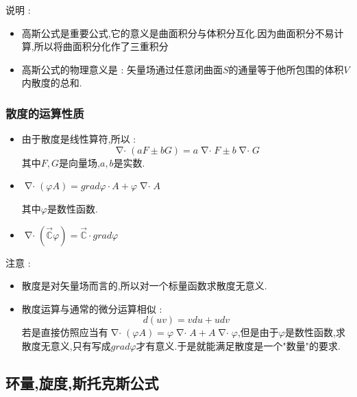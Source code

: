 \documentclass[UTF8,12pt]{ctexbook}
\newcommand{\mathConstant}{\mathbb{C}}
\DeclareMathOperator{\divergenceSymbol}{\nabla\cdot}
\begin{document}
{{{{{      说明 :
      \begin{itemize}
        \item {
              高斯公式是重要公式,它的意义是曲面积分与体积分互化.因为曲面积分不易计算,所以将曲面积分化作了三重积分
              }
        \item {
              高斯公式的物理意义是 : 矢量场通过任意闭曲面$S$的通量等于他所包围的体积$V$内散度的总和.
              }
      \end{itemize}
    }%

    \subsubsection{散度的运算性质}{
      \begin{itemize}
        \item {
              由于散度是线性算符,所以 :
              $$
                \divergenceSymbol(aF \pm bG) = a\divergenceSymbol F \pm b\divergenceSymbol G
              $$
              其中$F,G$是向量场,$a,b$是实数.
              }
        \item {
              $\divergenceSymbol(\varphi A) = grad \varphi \cdot A + \varphi\divergenceSymbol A$

              其中$\varphi$是数性函数.
              }
        \item {
              $\divergenceSymbol (\vec{\mathConstant}\varphi) = \vec{\mathConstant} \cdot grad \varphi$
              }
      \end{itemize}

      注意 :
      \begin{itemize}
        \item 散度是对矢量场而言的,所以对一个标量函数求散度无意义.
        \item {
              散度运算与通常的微分运算相似 :
              $$
                d(uv) = vdu + udv
              $$
              若是直接仿照应当有$\divergenceSymbol (\varphi A) = \varphi\divergenceSymbol A + A\divergenceSymbol \varphi$,但是由于$\varphi$是数性函数,求散度无意义,只有写成$grad \varphi$才有意义.于是就能满足散度是一个"数量"的要求.
              }
      \end{itemize}
    }%

  }%

  \subsection{环量,旋度,斯托克斯公式}{
}}}}
\end{document}
